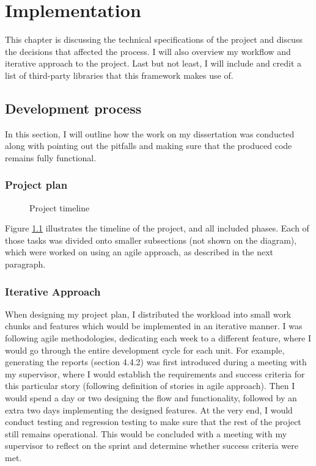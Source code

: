 \chapter{Implementation\label{chap:implementation}}
This chapter is discussing the technical specifications of the project and discuss the decisions that affected the process. I will also overview my workflow and iterative approach to the project. Last but not least, I will include and credit a list of third-party libraries that this framework makes use of.

\section{Development process}

In this section, I will outline how the work on my dissertation was conducted along with pointing out the pitfalls and making sure that the produced code remains fully functional.

\subsection{Project plan}

\begin{figure}[h]
    \centering
    \caption{Project timeline}
    \label{fig:timeline}
\end{figure}

Figure \ref{fig:timeline} illustrates the timeline of the project, and all included phases. Each of those tasks was divided onto smaller subsections (not shown on the diagram), which were worked on using an agile approach, as described in the next paragraph.

\subsection{Iterative Approach}

When designing my project plan, I distributed the workload into small work chunks and features which would be implemented in an iterative manner. I was following agile methodologies, dedicating each week to a different feature, where I would go through the entire development cycle for each unit. For example, generating the reports (section 4.4.2) was first introduced during a meeting with my supervisor, where I would establish the requirements and success criteria for this particular story (following definition of stories in agile approach). Then I would spend a day or two designing the flow and functionality, followed by an extra two days implementing the designed features. At the very end, I would conduct testing and regression testing to make sure that the rest of the project still remains operational. This would be concluded with a meeting with my supervisor to reflect on the sprint and determine whether success criteria were met.


